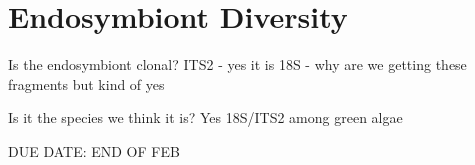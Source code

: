 % 
\graphicspath{{chapters/3.Chapter_1/figures}}

\chapter{Endosymbiont Diversity}

Is the endosymbiont clonal?
ITS2 - yes it is
18S - why are we getting these fragments but kind of yes

Is it the species we think it is?
Yes 18S/ITS2 among green algae

DUE DATE: END OF FEB
